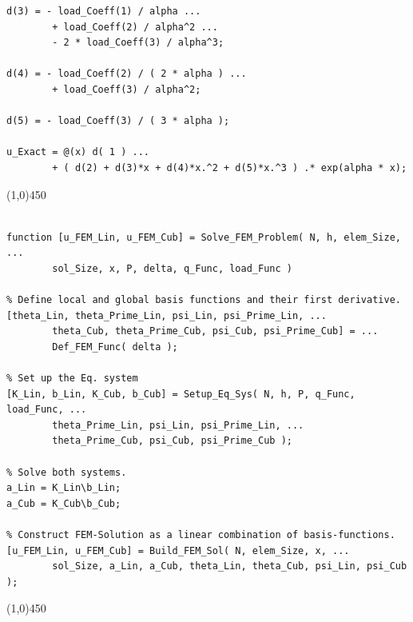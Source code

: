 \begin{lstlisting}[caption = {Define the Problem and Its Analytical Solution}, label = lst:Def_Problem]
d(3) = - load_Coeff(1) / alpha ...
		+ load_Coeff(2) / alpha^2 ...
		- 2 * load_Coeff(3) / alpha^3;

d(4) = - load_Coeff(2) / ( 2 * alpha ) ...
		+ load_Coeff(3) / alpha^2;

d(5) = - load_Coeff(3) / ( 3 * alpha );

u_Exact = @(x) d( 1 ) ...
		+ ( d(2) + d(3)*x + d(4)*x.^2 + d(5)*x.^3 ) .* exp(alpha * x);

\end{lstlisting}
\line(1,0){450}
\vspace{5 mm}

\begin{lstlisting}[caption = {Solve FEM-Problem and Build up Solution as a Power Series}, label = lst:Solve_Eq_Sys]

function [u_FEM_Lin, u_FEM_Cub] = Solve_FEM_Problem( N, h, elem_Size, ...
		sol_Size, x, P, delta, q_Func, load_Func )

% Define local and global basis functions and their first derivative.
[theta_Lin, theta_Prime_Lin, psi_Lin, psi_Prime_Lin, ...
		theta_Cub, theta_Prime_Cub, psi_Cub, psi_Prime_Cub] = ...
		Def_FEM_Func( delta );

% Set up the Eq. system
[K_Lin, b_Lin, K_Cub, b_Cub] = Setup_Eq_Sys( N, h, P, q_Func, load_Func, ...
		theta_Prime_Lin, psi_Lin, psi_Prime_Lin, ...
		theta_Prime_Cub, psi_Cub, psi_Prime_Cub );

% Solve both systems.
a_Lin = K_Lin\b_Lin;
a_Cub = K_Cub\b_Cub;

% Construct FEM-Solution as a linear combination of basis-functions.
[u_FEM_Lin, u_FEM_Cub] = Build_FEM_Sol( N, elem_Size, x, ...
		sol_Size, a_Lin, a_Cub, theta_Lin, theta_Cub, psi_Lin, psi_Cub );

\end{lstlisting}
\line(1,0){450}
\vspace{5 mm}


